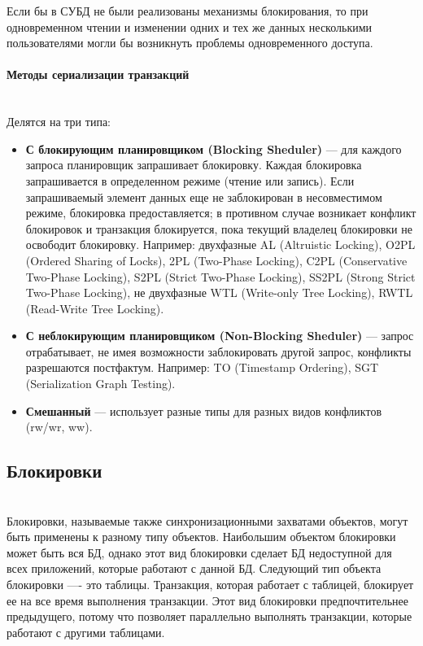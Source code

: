Если бы в СУБД не были реализованы механизмы блокирования, то при одновременном чтении и изменении одних и тех же данных несколькими пользователями могли бы возникнуть проблемы одновременного доступа.

\paragraph{Методы сериализации транзакций} ~\\

Делятся на три типа:

\begin{itemize}
    \item 
        \textbf{С блокирующим планировщиком (Blocking Sheduler)} — для каждого запроса планировщик запрашивает блокировку. Каждая блокировка запрашивается в определенном режиме (чтение или запись). Если запрашиваемый элемент данных еще не заблокирован в несовместимом режиме, блокировка предоставляется; в противном случае возникает конфликт блокировок и транзакция блокируется, пока текущий владелец блокировки не освободит блокировку. Например: двухфазные AL (Altruistic Locking), O2PL (Ordered Sharing of Locks), 2PL (Two-Phase Locking), C2PL (Conservative Two-Phase Locking), S2PL (Strict Two-Phase Locking), SS2PL (Strong Strict Two-Phase Locking), не двухфазные WTL (Write-only Tree Locking), RWTL (Read-Write Tree Locking).
    \item 
        \textbf{С неблокирующим планировщиком (Non-Blocking Sheduler)} — запрос отрабатывает, не имея возможности заблокировать другой запрос, конфликты разрешаются постфактум. Например: TO (Timestamp Ordering), SGT (Serialization Graph Testing).
    \item 
        \textbf{Смешанный} — использует разные типы для разных видов конфликтов (rw/wr, ww).\autocite{TransactionalInformationSystems}
\end{itemize}

\subsection{Блокировки} ~\\

Блокировки, называемые также синхронизационными захватами объектов, могут быть применены к разному типу объектов. Наибольшим объектом блокировки может быть вся БД, однако этот вид блокировки сделает БД недоступной для всех приложений, которые работают с данной БД. Следующий тип объекта блокировки —- это таблицы. Транзакция, которая работает с таблицей, блокирует ее на все время выполнения транзакции. Этот вид блокировки предпочтительнее предыдущего, потому что позволяет параллельно выполнять транзакции, которые работают с другими таблицами.


